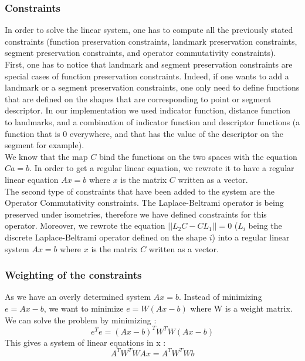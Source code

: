 \documentclass[10pt,twocolumn,letterpaper]{article}
\begin{document}
\subsubsection*{Constraints} %
In order to solve the linear system, one has to compute all the previously stated constraints (function preservation constraints, landmark preservation constraints, segment preservation constraints, and operator commutativity constraints). \\

First, one has to notice that landmark and segment preservation constraints are special cases of function preservation constraints. Indeed, if one wants to add a landmark or a segment preservation constraints, one only need to define functions that are defined on the shapes that are corresponding to point or segment descriptor. In our implementation we used indicator function, distance function to landmarks, and a combination of indicator function and descriptor functions (a function that is $0$ everywhere, and that has the value of the descriptor on the segment for example). \\

We know that the map $C$ bind the functions on the two spaces with the equation $Ca = b$. In order to get a regular linear equation, we rewrote it to have a regular linear equation $Ax = b$ where $x$ is the matrix $C$ written as a vector.\\

The second type of constraints that have been added to the system are the Operator Commutativity constraints. The Laplace-Beltrami operator is being preserved under isometries, therefore we have defined constraints for this operator. Moreover, we rewrote the equation $||L_{2}C - CL_{1}|| = 0$ ($L_{i}$ being the discrete Laplace-Beltrami operator defined on the shape $i$) into a regular linear system $Ax = b$ where $x$ is the matrix $C$ written as a vector. 

\subsubsection*{Weighting of the constraints}
As we have an overly determined system $Ax = b$. Instead of minimizing $e = Ax-b$, we want to minimize $e = W(Ax-b)$ where W is a weight matrix. We can solve the problem by minimizing :
\begin{equation}
e^{T}e = (Ax-b)^{T}W^{T}W(Ax-b)
\end{equation}
This gives a system of linear equations in x :
\begin{equation}
A^{T}W^{T}WAx = A^{T}W^{T}Wb
\end{equation}
\end{document}
